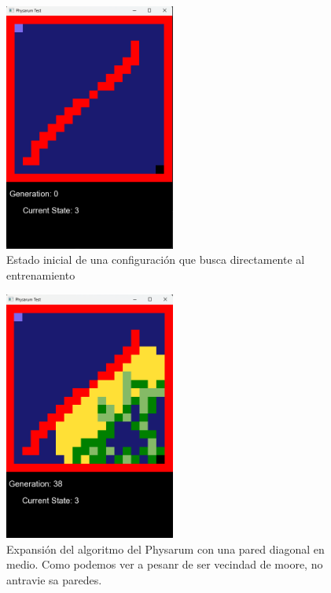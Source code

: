     \vskip 0.5cm
    \begin{figure}[htbp]
        \centering
        \includegraphics[width=0.5\textwidth]{./images/Pruebas/simulador/image065.png}
        \caption{Estado inicial de una configuraci\'on que busca directamente al entrenamiento}
        \label{fig:Ruta 65}
    \end{figure}
    \vskip 0.5cm
    \begin{figure}[htbp]
        \centering
        \includegraphics[width=0.5\textwidth]{./images/Pruebas/simulador/image067.png}
        \caption{Expansi\'on del algoritmo del Physarum con una pared diagonal en medio. Como podemos ver a pesanr de ser vecindad de moore, no antravie sa paredes.}
        \label{fig:Ruta 67}
    \end{figure}
